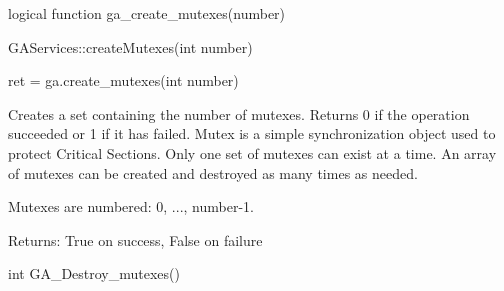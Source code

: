\documentclass[10pt]{article}
\begin{document}
\begin{fapi}
\begin{fcode}
logical function ga_create_mutexes(number)
\end{fcode}
\begin{funcargs}
\end{funcargs}
\end{fapi}

\begin{cxxapi}
\begin{cxxcode}
GAServices::createMutexes(int number)
\end{cxxcode}
\begin{funcargs}
\end{funcargs}
\end{cxxapi}

\begin{pyapi}
\begin{pycode}
ret = ga.create_mutexes(int number)
\end{pycode}
\begin{funcargs}
\end{funcargs}
\end{pyapi}

\wcoll

\begin{desc}

Creates a set containing the number of mutexes. Returns 0 if the operation
succeeded or 1 if it has failed. Mutex is a simple synchronization object used
to protect Critical Sections. Only one set of mutexes can exist at a time. An
array of mutexes can be created and destroyed as many times as needed.

Mutexes are numbered: 0, ..., number-1.

Returns: True on success, False on failure

\end{desc}


\begin{capi}
\begin{ccode}
int GA_Destroy_mutexes()
\end{ccode}
\begin{funcargs}
\end{funcargs}
\end{capi}
\end{document}
